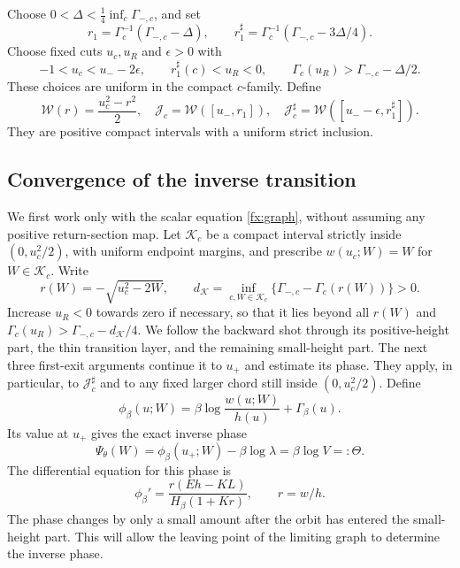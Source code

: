Choose \(0<\Delta<\frac14\inf_c\Gamma_{-,c}\), and set
\[
 r_1=\Gamma_c^{-1}(\Gamma_{-,c}-\Delta),\qquad
 r_1^\sharp=\Gamma_c^{-1}(\Gamma_{-,c}-3\Delta/4).
\]
Choose fixed cuts \(u_c,u_R\) and \(\epsilon>0\) with
\[
 -1<u_c<u_--2\epsilon,\qquad
 r_1^\sharp(c)<u_R<0,\qquad
 \Gamma_c(u_R)>\Gamma_{-,c}-\Delta/2 .
\]
These choices are uniform in the compact \(c\)-family. Define
\begin{equation}\label{fx:W-limit}
 \mathcal W(r)=\frac{u_c^2-r^2}{2},\quad
 \mathcal J_c=\mathcal W([u_-,r_1]),\quad
 \mathcal J_c^\sharp=\mathcal W([u_--\epsilon,r_1^\sharp]).
\end{equation}
They are positive compact intervals with a uniform strict inclusion.

\subsection{Convergence of the inverse transition}

We first work only with the scalar equation \eqref{fx:graph}, without
assuming any positive return-section map. Let \(\mathcal K_c\) be a
compact interval strictly inside \((0,u_c^2/2)\), with uniform endpoint
margins, and prescribe \(w(u_c;W)=W\) for \(W\in\mathcal K_c\).
Write
\[
 r(W)=-\sqrt{u_c^2-2W},\qquad
 d_{\mathcal K}=\inf_{c,W\in\mathcal K_c}
       \{\Gamma_{-,c}-\Gamma_c(r(W))\}>0.
\]
Increase \(u_R<0\) towards zero if necessary, so that it lies beyond
all \(r(W)\) and
\(\Gamma_c(u_R)>\Gamma_{-,c}-d_{\mathcal K}/4\).
We follow the backward shot through its positive-height part, the thin
transition layer, and the remaining small-height part. The next three
first-exit arguments continue it to \(u_+\) and estimate its phase.
They apply, in particular, to
\(\mathcal J_c^\sharp\) and to any fixed larger chord still inside
\((0,u_c^2/2)\). Define
\begin{equation}\label{fx:extracted-phase}
 \phi_\beta(u;W)=\beta\log\frac{w(u;W)}{h(u)}+\Gamma_\beta(u).
\end{equation}
Its value at \(u_+\) gives the exact inverse phase
\begin{equation}\label{fx:inverse-phase}
 \Psi_\theta(W)=\phi_\beta(u_+;W)-\beta\log\lambda
                 =\beta\log V=:\Theta .
\end{equation}
The differential equation for this phase is
\begin{equation}\label{fx:phase-equation}
 \phi_\beta'=\frac{r(Eh-KL)}{H_\beta(1+Kr)},\qquad r=w/h .
\end{equation}
The phase changes by only a small amount after the orbit has entered
the small-height part. This will allow the leaving point of the limiting
graph to determine the inverse phase.

